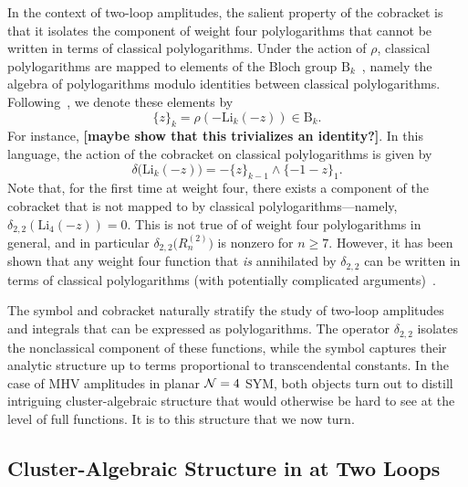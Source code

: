 \documentclass[11pt]{article}
\def\draftnote#1{{\bf [#1]}}
\begin{document}
In the context of two-loop amplitudes, the salient property of the cobracket is that it isolates the component of weight four polylogarithms that cannot be written in terms of classical polylogarithms. Under the action of $\rho$, classical polylogarithms are mapped to elements of the Bloch group $\text{B}_k$~\cite{Bloch:2000, Suslin:1990}, namely the algebra of polylogarithms modulo identities between classical polylogarithms. Following~\cite{Golden:2013xva}, we denote these elements by
\begin{equation}
 \{ z \}_k  = \rho(-\text{Li}_k(-z)) \in \text{B}_k.
\end{equation}
For instance, \draftnote{maybe show that this trivializes an identity?}. In this language, the action of the cobracket on classical polylogarithms is given by
\begin{equation}
\delta \big( \text{Li}_k(-z) \big) = - \{ z \}_{k-1} \wedge \{ -1-z \}_1 .
\end{equation}
Note that, for the first time at weight four, there exists a component of the cobracket that is not mapped to by classical polylogarithms---namely, $\delta_{2,2}(\text{Li}_4(-z))=0$. This is not true of of weight four polylogarithms in general, and in particular $\delta_{2,2} \big(R_n^{(2)} \big)$ is nonzero for $n\ge7$. However, it has been shown that any weight four function that \emph{is} annihilated by $\delta_{2,2}$ can be written in terms of classical polylogarithms (with potentially complicated arguments)~\cite{}. 

The symbol and cobracket naturally stratify the study of two-loop amplitudes and integrals that can be expressed as polylogarithms. The operator $\delta_{2,2}$ isolates the nonclassical component of these functions, while the symbol captures their analytic structure up to terms proportional to transcendental constants. In the case of MHV amplitudes in planar ${\cal N} = 4$ SYM, both objects turn out to distill intriguing cluster-algebraic structure that would otherwise be hard to see at the level of full functions. It is to this structure that we now turn.

\subsection{Cluster-Algebraic Structure in at Two Loops}\label{sec:cluster-algebra-R2n}

\end{document}
